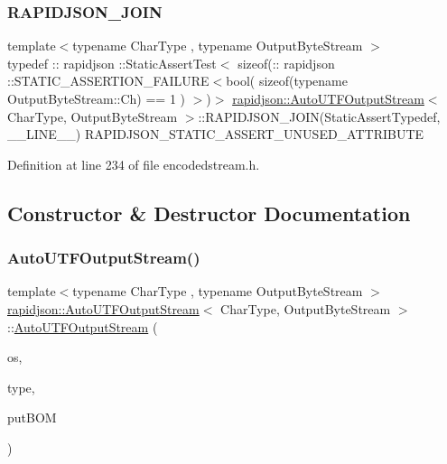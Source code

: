 \subsubsection{\texorpdfstring{RAPIDJSON\_JOIN}{RAPIDJSON\_JOIN}}
{\footnotesize\ttfamily template$<$typename Char\+Type , typename Output\+Byte\+Stream $>$ \\
typedef \+:: rapidjson \+::Static\+Assert\+Test$<$ sizeof(\+:: rapidjson \+::S\+T\+A\+T\+I\+C\+\_\+\+A\+S\+S\+E\+R\+T\+I\+O\+N\+\_\+\+F\+A\+I\+L\+U\+RE$<$bool( sizeof(typename Output\+Byte\+Stream\+::\+Ch) == 1 ) $>$)$>$ \mbox{\hyperlink{classrapidjson_1_1_auto_u_t_f_output_stream}{rapidjson\+::\+Auto\+U\+T\+F\+Output\+Stream}}$<$ Char\+Type, Output\+Byte\+Stream $>$\+::R\+A\+P\+I\+D\+J\+S\+O\+N\+\_\+\+J\+O\+IN(Static\+Assert\+Typedef, \+\_\+\+\_\+\+L\+I\+N\+E\+\_\+\+\_\+) R\+A\+P\+I\+D\+J\+S\+O\+N\+\_\+\+S\+T\+A\+T\+I\+C\+\_\+\+A\+S\+S\+E\+R\+T\+\_\+\+U\+N\+U\+S\+E\+D\+\_\+\+A\+T\+T\+R\+I\+B\+U\+TE\hspace{0.3cm}{\ttfamily [private]}}



Definition at line 234 of file encodedstream.\+h.



\subsection{Constructor \& Destructor Documentation}
\mbox{\label{classrapidjson_1_1_auto_u_t_f_output_stream_a39c828ee4c5b052df7338ec7fda1a17d}} 
\subsubsection{\texorpdfstring{AutoUTFOutputStream()}{AutoUTFOutputStream()}\hspace{0.1cm}{\footnotesize\ttfamily [1/2]}}
{\footnotesize\ttfamily template$<$typename Char\+Type , typename Output\+Byte\+Stream $>$ \\
\mbox{\hyperlink{classrapidjson_1_1_auto_u_t_f_output_stream}{rapidjson\+::\+Auto\+U\+T\+F\+Output\+Stream}}$<$ Char\+Type, Output\+Byte\+Stream $>$\+::\mbox{\hyperlink{classrapidjson_1_1_auto_u_t_f_output_stream}{Auto\+U\+T\+F\+Output\+Stream}} (\begin{DoxyParamCaption}\item[{Output\+Byte\+Stream \&}]{os,  }\item[{\mbox{\hyperlink{namespacerapidjson_a4aacabc0f8cea1cd628f466d890773eb}{U\+T\+F\+Type}}}]{type,  }\item[{bool}]{put\+B\+OM }\end{DoxyParamCaption})}



